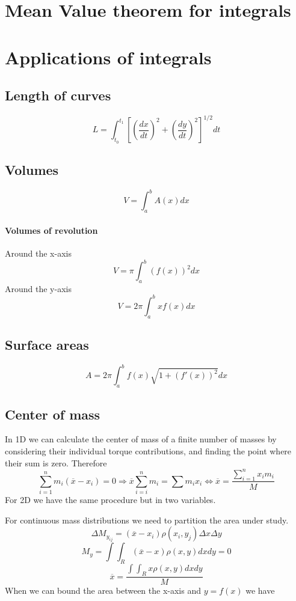 \documentclass{book}
\begin{document}
\section{Mean Value theorem for integrals}

\section{Applications of integrals}
\subsection{Length of curves}
$$L=\int_{t_0}^{t_1}\left[\left(\frac{dx}{dt}\right)^2+\left(\frac{dy}{dt}\right)^2\right]^{1/2}dt$$
\subsection{Volumes}
$$V=\int_a^bA(x)dx$$
\paragraph{Volumes of revolution}
Around the x-axis
$$V=\pi \int ^{b}_{a}\left( f\left( x\right) \right) ^{2}dx$$
Around the y-axis
$$V=2\pi \int ^{b}_{a}xf\left( x\right) dx$$
\subsection{Surface areas}
$$A=2\pi \int ^{b}_{a}f\left( x\right) \sqrt {1+\left( f'\left( x\right) \right) ^{2}}dx$$

\subsection{Center of mass}
In 1D we can calculate the center of mass of a finite number of masses by considering their individual torque contributions, and finding the point where their sum is zero. Therefore $$\sum ^{n}_{i=1}m_{i}\left( \overline {x}-x_{i}\right) =0\Rightarrow \overline {x}\sum ^{n}_{i=i}m_{i}=\sum m_{i}x_{i}\Leftrightarrow \overline {x}=\dfrac {\sum ^{n}_{i=1}x_{i}m_{i}}{M}$$
For 2D we have the same procedure but in two variables. 


For continuous mass distributions we need to partition the area under study.
$$\Delta M_{y_{ij}}=\left( \overline {x}-x_{i}\right) \rho \left( x_{i},y_{j}\right) \Delta x\Delta y$$
$$M_{y}=\int \int _{R}\left( \overline {x}-x\right) \rho \left( x,y\right) dxdy=0$$
$$\overline {x}=\dfrac {\int \int_R x\rho \left( x,y\right) dxdy}{M}$$
When we can bound the area between the x-axis and $y=f(x)$ we have 
\end{document}
